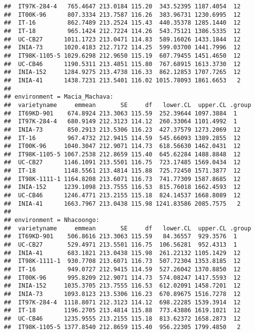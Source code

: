 \documentclass[]{book}
\theoremstyle{definition}
\theoremstyle{definition}
\theoremstyle{definition}
\theoremstyle{remark}
\begin{document}
\begin{verbatim}
##  IT97K-284-4   765.4647 213.0184 115.20  343.52395 1187.4054  12   
##  IT00K-96      807.3334 213.7587 116.26  383.96731 1230.6995  12   
##  IT-16         862.7489 213.2524 115.43  440.35378 1285.1440  12   
##  IT-18         965.1424 212.7224 114.26  543.75121 1386.5335  12   
##  UC-CB27      1011.1723 213.0471 114.83  589.16026 1433.1844  12   
##  INIA-73      1020.4183 212.7172 114.25  599.03700 1441.7996  12   
##  IT98K-1105-5 1029.6298 212.9650 115.19  607.79455 1451.4650  12   
##  UC-CB46      1190.5311 213.4851 115.80  767.68915 1613.3730  12   
##  INIA-152     1284.9275 213.4738 116.33  862.12853 1707.7265  12   
##  INIA-41      1438.7231 213.5401 116.02 1015.78093 1861.6653   2   
## 
## environment = Macia_Machava:
##  varietyname     emmean       SE     df   lower.CL  upper.CL .group
##  IT69KD-901    674.8924 213.3063 115.59  252.39644 1097.3884  1    
##  IT97K-284-4   680.9149 212.3123 114.12  260.33064 1101.4992  1    
##  INIA-73       850.2913 213.5306 116.23  427.37579 1273.2069  12   
##  IT-16         967.4732 212.9415 114.59  545.66093 1389.2855  12   
##  IT00K-96     1040.3047 212.9071 114.73  618.56630 1462.0431  12   
##  IT98K-1105-5 1067.2538 212.8659 115.40  645.62284 1488.8848  12   
##  UC-CB27      1146.1091 213.5501 116.75  723.17485 1569.0434  12   
##  IT-18        1148.5561 213.4814 115.88  725.72450 1571.3877  12   
##  IT98K-1111-1 1164.8208 213.6071 116.73  741.77309 1587.8685  12   
##  INIA-152     1239.1098 213.7555 116.53  815.76018 1662.4593  12   
##  UC-CB46      1246.4771 213.2155 115.18  824.14537 1668.8089  12   
##  INIA-41      1663.7967 213.0438 115.98 1241.83586 2085.7575   2   
## 
## environment = Nhacoongo:
##  varietyname     emmean       SE     df   lower.CL  upper.CL .group
##  IT69KD-901    506.8616 213.3063 115.59   84.36557  929.3576  1    
##  UC-CB27       529.4971 213.5501 116.75  106.56281  952.4313  1    
##  INIA-41       683.1821 213.0438 115.98  261.22132 1105.1429  12   
##  IT98K-1111-1  930.7708 213.6071 116.73  507.72304 1353.8185  12   
##  IT-16         949.0727 212.9415 114.59  527.26042 1370.8850  12   
##  IT00K-96      995.8209 212.9071 114.73  574.08247 1417.5593  12   
##  INIA-152     1035.3705 213.7555 116.53  612.02091 1458.7201  12   
##  INIA-73      1093.8123 213.5306 116.23  670.89675 1516.7278  12   
##  IT97K-284-4  1118.8071 212.3123 114.12  698.22285 1539.3914  12   
##  IT-18        1196.2705 213.4814 115.88  773.43886 1619.1021  12   
##  UC-CB46      1235.9555 213.2155 115.18  813.62372 1658.2873  12   
##  IT98K-1105-5 1377.8540 212.8659 115.40  956.22305 1799.4850   2   

\end{verbatim}
\end{document}
